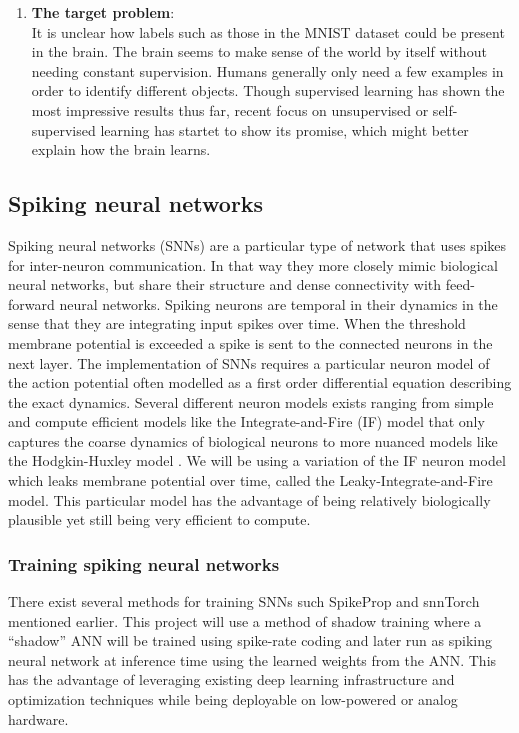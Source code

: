 \documentclass[a4paper,11pt]{article} %
\begin{document}
\begin{enumerate}
  \item \textbf{The target problem}: \vspace{5pt} \\
  It is unclear how labels such as those in the MNIST dataset could be present in the brain. The brain seems to make sense of the world by itself without needing constant supervision. Humans generally only need a few examples in order to identify different objects. Though supervised learning has shown the most impressive results thus far, recent focus on unsupervised or self-supervised learning has startet to show its promise, which might better explain how the brain learns. 
\end{enumerate}




\newpage

\subsection{Spiking neural networks}
Spiking neural networks (SNNs) are a particular type of network that uses spikes for inter-neuron communication. In that way they more closely mimic biological neural networks, but share their structure and dense connectivity with feed-forward neural networks. Spiking neurons are temporal in their dynamics in the sense that they are integrating input spikes over time. When the threshold membrane potential is exceeded a spike is sent to the connected neurons in the next layer. The implementation of SNNs requires a particular neuron model of the action potential often modelled as a first order differential equation describing the exact dynamics. Several different neuron models exists ranging from simple and compute efficient models like the Integrate-and-Fire (IF) model that only captures the coarse dynamics of biological neurons to more nuanced models like the Hodgkin-Huxley model \cite{Hodgkin1952}. We will be using a variation of the IF neuron model which leaks membrane potential over time, called the Leaky-Integrate-and-Fire model. This particular model has the advantage of being relatively biologically plausible yet still being very efficient to compute. 

\subsubsection{Training spiking neural networks}
There exist several methods for training SNNs such SpikeProp \cite{Boht2000SpikePropBF} and snnTorch \cite{eshraghian2021training} mentioned earlier. This project will use a method of shadow training where a ``shadow'' ANN will be trained using spike-rate coding and later run as spiking neural network at inference time using the learned weights from the ANN. This has the advantage of leveraging existing deep learning infrastructure and optimization techniques while being deployable on low-powered or analog hardware. 
\end{document}
